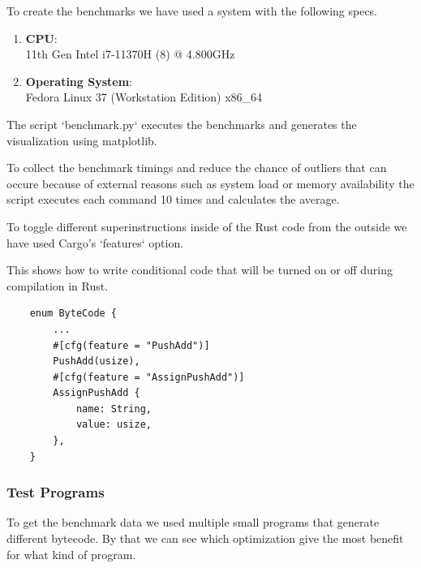 \documentclass{article}
\begin{document}
To create the benchmarks we have used a system with the following specs.

\begin{enumerate}
    \item \textbf{CPU}:\\
        11th Gen Intel i7-11370H (8) @ 4.800GHz 
    \item \textbf{Operating System}:\\
        Fedora Linux 37 (Workstation Edition) x86\_64 
\end{enumerate}

The script `benchmark.py` executes the benchmarks and generates the
visualization using matplotlib.

To collect the benchmark timings and reduce the chance of outliers that can
occure because of external reasons such as system load or memory availability
the script executes each command 10 times and calculates the average.

To toggle different superinstructions inside of the Rust code from the 
outside we have used Cargo's `features` option.

This shows how to write conditional code that will be turned on or off during
compilation in Rust.

\begin{verbatim}
    enum ByteCode {
        ...
        #[cfg(feature = "PushAdd")]
        PushAdd(usize),
        #[cfg(feature = "AssignPushAdd")]
        AssignPushAdd {
            name: String,
            value: usize,
        },
    }
\end{verbatim}

\subsubsection{Test Programs}
To get the benchmark data we used multiple small programs that generate
different bytecode. By that we can see which optimization give the most
benefit for what kind of program.
\end{document}
